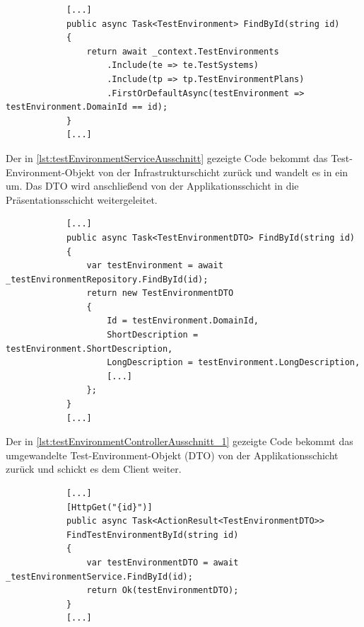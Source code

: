 \documentclass[a4paper, fontsize=11pt, parskip=half, twoside]{scrreprt}
\begin{document}
	\begin{listing}[ht]
		\begin{verbatim}
			[...]		
			public async Task<TestEnvironment> FindById(string id)
			{
				return await _context.TestEnvironments
					.Include(te => te.TestSystems)
					.Include(tp => tp.TestEnvironmentPlans)
					.FirstOrDefaultAsync(testEnvironment => testEnvironment.DomainId == id);		
			}		
			[...]
		\end{verbatim}
		\caption{Ausschnitt der \emph{TestEnvironmentRepository}-Klasse, die ein Test-Environment-Objekt mithilfe einer \ac{ID} von der Datenbank ausliest}
		\label{lst:testEnvironmentRepositoryAusschnitt_1}
	\end{listing}
	
	Der in \autoref{lst:testEnvironmentServiceAusschnitt} gezeigte Code bekommt das Test-Environment-Objekt von der Infrastrukturschicht zurück und wandelt es in ein  um.
	Das \ac{DTO} wird anschließend von der Applikationsschicht in die Präsentationsschicht weitergeleitet.

	\begin{listing}[!htb]
		\begin{verbatim}
			[...]				
			public async Task<TestEnvironmentDTO> FindById(string id)
			{
				var testEnvironment = await _testEnvironmentRepository.FindById(id);	
				return new TestEnvironmentDTO
				{
					Id = testEnvironment.DomainId,
					ShortDescription = testEnvironment.ShortDescription,
					LongDescription = testEnvironment.LongDescription,
					[...]	
				};
			}			
			[...]
		\end{verbatim}
		\caption{Ausschnitt der \emph{TestEnvironmentService}-Klasse}
		\label{lst:testEnvironmentServiceAusschnitt}
	\end{listing}

	Der in \autoref{lst:testEnvironmentControllerAusschnitt_1} gezeigte Code bekommt das umgewandelte Test-Environment-Objekt (\ac{DTO}) von der Applikationsschicht zurück und schickt es dem Client weiter.
	
	\begin{listing}[!htb]
		\begin{verbatim}
			[...]	
			[HttpGet("{id}")]
			public async Task<ActionResult<TestEnvironmentDTO>> 
			FindTestEnvironmentById(string id)
			{
				var testEnvironmentDTO = await _testEnvironmentService.FindById(id);
				return Ok(testEnvironmentDTO);
			}	
			[...]
		\end{verbatim}
		\caption{Ausschnitt der \emph{TestEnvironmentController}-Klasse}
		\label{lst:testEnvironmentControllerAusschnitt_1}
	\end{listing}
\end{document}
